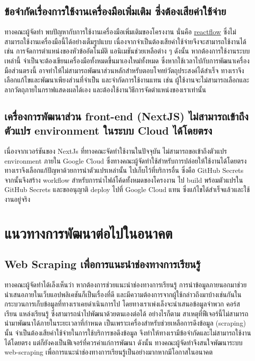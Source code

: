 \subsection{ข้อจำกัดเรื่องการใช้งานเครื่องมือเพิ่มเติม ซึ่งต้องเสียค่าใช้จ่าย}
\par{
    ทางคณะผู้จัดทำ พบปัญหากับการใช้งานเครื่องมือเพิ่มเติมของโครงงาน นั่นคือ \hyperref[subsec:reactflow]{reactflow} ซึ่งไม่สามารถใช้งานเครื่องมือนี้ได้อย่างเต็มรูปแบบ
    เนื่องจากจำเป็นต้องเสียค่าใช้จ่ายจึงจะสามารถใช้งานได้ เช่น การจัดการตำแหน่งของหัวข้ออัตโนมัติ แอนิเมชันช่วยเหลือต่าง ๆ ดังนั้น หากต้องการใช้งานระบบเหล่านี้ จำเป็นจะต้องเขียนเครื่องมือทั้งหมดขึ้นมาเองใหม่ทั้งหมด
    ซึ่งหากใช้เวลาไปกับการพัฒนาเครื่องมือส่วนตรงนี้ อาจทำให้ไม่สามารถพัฒนาส่วนหลักสำหรับตอบโจทย์วัตถุประสงค์ได้สำเร็จ ทางเราจึงเลือกแก้ไขและพัฒนาเพียงส่วนที่จำเป็น และจำกัดการใช้งานแทน
    เช่น ผู้ใช้งานจะไม่สามารถเลือกและลากวัตถุภายในกราฟแสดงผลได้เอง และต้องใช้งานวิธีการจัดตำแหน่งของเราเท่านั้น
}
\subsection{เครื่องการพัฒนาส่วน front-end (NextJS) ไม่สามารถเข้าถึงตัวแปร environment ในระบบ Cloud ได้โดยตรง}
\par{
    เนื่องจากเวอร์ชันของ NextJs ที่ทางคณะจัดทำใช้งานในปัจจุบัน ไม่สามารถขอเข้าถึงตัวแปร environment ภายใน Google Cloud ซึ่งทางคณะผู้จัดทำใช้สำหรับการปล่อยให้ใช้งานได้โดยตรง
    ทางเราจึงเลือกแก้ปัญหาด้วยการนำตัวแปรเหล่านั้น ไปเก็บไว้ที่บริการอื่น ซึ่งคือ GitHub Secrets จากนั้นจึงสร้าง workflow สำหรับการนำไฟล์โค้ดทั้งหมดของโครงงาน
    ไป build พร้อมตัวแปรใน GitHub Secrets และขออนุญาติ deploy ไปที่ Google Cloud แทน ซึ่งแก้ไขได้สำเร็จแล้วและใช้งานอยู่จริง
}

\section{แนวทางการพัฒนาต่อไปในอนาคต}
\subsection{Web Scraping เพื่อการแนะนำช่องทางการเรียนรู้}
\par{
    ทางคณะผู้จัดทำได้เล็งเห็นว่า หากต้องการช่วยแนะนำช่องทางการเรียนรู้ การนำข้อมูลภายนอกมาช่วยนำเสนอภายในเว็บแอปพลิเคชันก็เป็นเรื่องที่ดี และมีความต้องการจากผู้ใช้กล่าวถึงมาบ้างเช่นกันในกระบวนการเก็บข้อมูลที่ทางเราเคยดำเนินการไป
    โดยทางเราเพ่งเล็งจะนำเสนอข้อมูลจำพวก คอร์สเรียน แหล่งเรียนรู้ ซึ่งสามารถนำไปพัฒนาด้วยตนเองต่อได้ อย่างไรก็ตาม สาเหตุที่ฟีเจอร์นี้ไม่สามารถนำมาพัฒนาได้ภายในระยะเวลาที่กำหนด
    เป็นเพราะเครื่องสำหรับช่วยเหลือการดึงข้อมูล (scraping) นั้น จำเป็นต้องเสียค่าใช้จ่ายในการใช้บริการขอดึงข้อมูล จึงทำให้ทางเรามีข้อจำกัดและไม่สามารถใช้งานได้โดยตรง แต่ก็ยังคงเป็นฟีเจอร์ที่ควรค่าแก่การพัฒนา ดังนั้น
    ทางคณะผู้จัดทำจึงสนใจพัฒนาระบบ web-scraping เพื่อการแนะนำช่องทางการเรียนรู้เป็นอย่างมากหากมีโอกาสในอนาคต
}